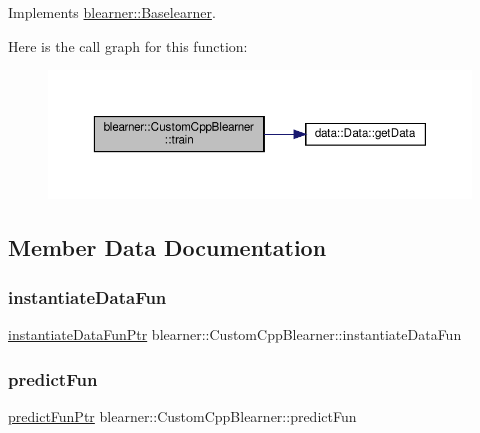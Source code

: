 Implements \hyperlink{classblearner_1_1_baselearner_a40e03ad070b9a03aae706d9ee8094b80}{blearner\+::\+Baselearner}.

Here is the call graph for this function\+:\nopagebreak
\begin{figure}[H]
\begin{center}
\leavevmode
\includegraphics[width=350pt]{classblearner_1_1_custom_cpp_blearner_aa71b777d7092a3d9b47a9bed125eb0f9_cgraph}
\end{center}
\end{figure}


\subsection{Member Data Documentation}
\mbox{\label{classblearner_1_1_custom_cpp_blearner_a51d1b6de280bcfa542b1e0cf87ee5bce}} 
\subsubsection{\texorpdfstring{instantiate\+Data\+Fun}{instantiateDataFun}}
{\footnotesize\ttfamily \hyperlink{namespaceblearner_a10cec16134a934fb9defbdc2c2011f2a}{instantiate\+Data\+Fun\+Ptr} blearner\+::\+Custom\+Cpp\+Blearner\+::instantiate\+Data\+Fun\hspace{0.3cm}{\ttfamily [private]}}

\mbox{\label{classblearner_1_1_custom_cpp_blearner_a3de859c383be2320f1c2a9b4954a91b0}} 
\subsubsection{\texorpdfstring{predict\+Fun}{predictFun}}
{\footnotesize\ttfamily \hyperlink{namespaceblearner_a93d5b51440d434704d2bde9dee652f6e}{predict\+Fun\+Ptr} blearner\+::\+Custom\+Cpp\+Blearner\+::predict\+Fun\hspace{0.3cm}{\ttfamily [private]}}

